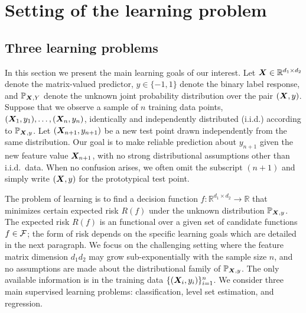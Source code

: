 \documentclass[mathptm]{statsoc}
\begin{document}
\section{Setting of the learning problem}
\subsection{Three learning problems}
In this section we present the main learning goals of our interest. Let $\bm X\in\mathbb{R}^{d_1\times d_2}$ denote the matrix-valued predictor, $y\in\{-1,1\}$ denote the binary label response, and $\mathbb{P}_{\bm X,Y}$ denote the unknown joint probability distribution over the pair $(\bm X,y)$. Suppose that we observe a sample of $n$ training data points, $(\bm X_1,y_1),\ldots,(\bm X_n,y_n)$, identically and independently distributed (i.i.d.) according to $\mathbb{P}_{\bm X,y}$. Let $(\bm X_{n+1},y_{n+1})$ be a new test point drawn independently from the same distribution. Our goal is to make reliable prediction about $y_{n+1}$ given the new feature value $\bm X_{n+1}$, with no strong distributional assumptions other than i.i.d.\ data. When no confusion arises, we often omit the subscript $(n+1)$ and simply write $(\bm X,y)$ for the prototypical test point. 

 
The problem of learning is to find a decision function $f\colon \mathbb{R}^{d_1\times d_2}\to \mathbb{R}$ that minimizes certain expected risk $R(f)$ under the unknown distribution $\mathbb{P}_{\bm X,y}$. The expected risk $R(f)$ is an functional over a given set of candidate functions $f\in \mathcal{F}$; the form of risk depends on the specific learning goals which are detailed in the next paragraph. We focus on the challenging setting where the feature matrix dimension $d_1d_2$ may grow sub-exponentially with the sample size $n$, and no assumptions are made about the distributional family of $\mathbb{P}_{\bm X,y}$. The only available information is in the training data $\{(\bm X_i,y_i)\}_{i=1}^n$. We consider three main supervised learning problems: classification, level set estimation, and regression. 
\end{document}
